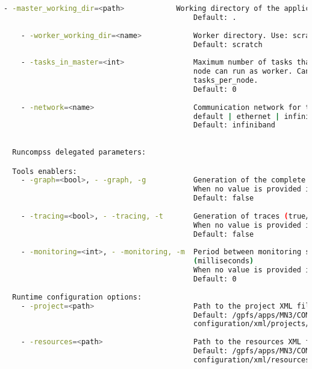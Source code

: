 \begin{lstlisting}[language=bash]
    - -master_working_dir=<path>            Working directory of the application
                                            Default: .
                                            
    - -worker_working_dir=<name>            Worker directory. Use: scratch | gpfs
                                            Default: scratch
                                            
    - -tasks_in_master=<int>                Maximum number of tasks that the master
                                            node can run as worker. Cannot exceed 
                                            tasks_per_node.
                                            Default: 0
                                            
    - -network=<name>                       Communication network for transfers:
                                            default | ethernet | infiniband | data.
                                            Default: infiniband
          
          
  Runcompss delegated parameters:

  Tools enablers:
    - -graph=<bool>, - -graph, -g           Generation of the complete graph (true/false)
                                            When no value is provided it is set to true
                                            Default: false
                                            
    - -tracing=<bool>, - -tracing, -t       Generation of traces (true/false)
                                            When no value is provided it is set to true
                                            Default: false
                                            
    - -monitoring=<int>, - -monitoring, -m  Period between monitoring samples 
                                            (milliseconds)
                                            When no value is provided it is set to 2000
                                            Default: 0
                                            
  Runtime configuration options:
    - -project=<path>                       Path to the project XML file
                                            Default: /gpfs/apps/MN3/COMPSs/1.3/Runtime/
                                            configuration/xml/projects/project.xml
                                            
    - -resources=<path>                     Path to the resources XML file
                                            Default: /gpfs/apps/MN3/COMPSs/1.3/Runtime/
                                            configuration/xml/resources/resources.xml
                                            

\end{lstlisting}
